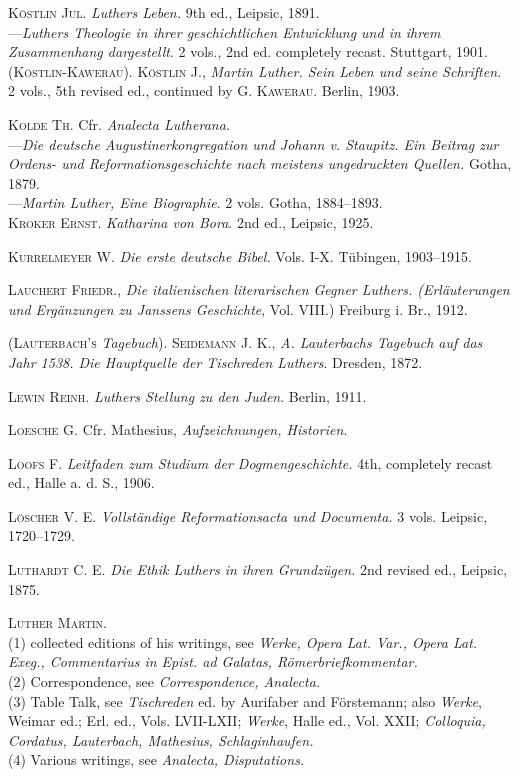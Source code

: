 \textsc{Köstlin Jul.} \textit{Luthers Leben.} 9th ed., Leipsic, 1891. \\
---\textit{Luthers Theologie in ihrer geschichtlichen Entwicklung und in ihrem
Zusammenhang dargestellt}. 2 vols., 2nd ed. completely recast. Stuttgart,
1901. \\

(\textsc{Köstlin-Kawerau}). \textsc{Köstlin J.}, \textit{Martin Luther. Sein Leben und seine
Schriften.} 2 vols., 5th revised ed., continued by \textsc{G. Kawerau}. Berlin,
1903.

\textsc{Kolde Th.} Cfr. \textit{Analecta Lutherana.} \\
---\textit{Die deutsche Augustinerkongregation und Johann v. Staupitz. Ein
Beitrag zur Ordens- und Reformationsgeschichte nach meistens ungedruckten
Quellen.} Gotha, 1879. \\
---\textit{Martin Luther, Eine Biographie}. 2 vols. Gotha, 1884--1893. \\

\textsc{Kroker Ernst.} \textit{Katharina von Bora}. 2nd ed., Leipsic, 1925.

\textsc{Kurrelmeyer W.} \textit{Die erste deutsche Bibel.} Vols. I-X. Tübingen, 1903--1915.

\textsc{Lauchert Friedr.}, \textit{Die italienischen literarischen Gegner Luthers. (Erläuterungen
und Ergänzungen zu Janssens Geschichte}, Vol. VIII.) Freiburg i.
Br., 1912.

(\textsc{Lauterbach’s} \textit{Tagebuch}). \textsc{Seidemann J. K.}, \textit{A. Lauterbachs Tagebuch
auf das Jahr 1538. Die Hauptquelle der Tischreden Luthers}. Dresden, 1872.

\textsc{Lewin Reinh.} \textit{Luthers Stellung zu den Juden}. Berlin, 1911.

\textsc{Loesche G.} Cfr. Mathesius, \textit{Aufzeichnungen, Historien.}

\textsc{Loofs F.} \textit{Leitfaden zum Studium der Dogmengeschichte.} 4th, completely
recast ed., Halle a. d. S., 1906.

\textsc{Löscher V. E.} \textit{Vollständige Reformationsacta und Documenta.} 3 vols.
Leipsic, 1720--1729.

\textsc{Luthardt C. E.} \textit{Die Ethik Luthers in ihren Grundzügen.} 2nd revised ed.,
Leipsic, 1875.

\textsc{Luther Martin.} \\
(1) collected editions of his writings, see \textit{Werke, Opera
Lat. Var., Opera Lat. Exeg., Commentarius in Epist. ad Galatas, Römerbriefkommentar.} \\
(2) Correspondence, see \textit{Correspondence, Analecta.} \\
(3) Table Talk, see \textit{Tischreden} ed. by Aurifaber and Förstemann; also
\textit{Werke}, Weimar ed.; Erl. ed., Vols. LVII-LXII; \textit{Werke}, Halle ed., Vol.
XXII; \textit{Colloquia, Cordatus, Lauterbach, Mathesius, Schlaginhaufen.} \\
(4) Various writings, see \textit{Analecta, Disputations.}


